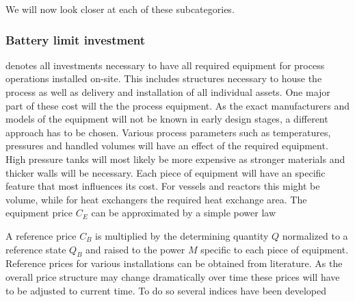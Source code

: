 %

We will now look closer at each of these subcategories. 

\subsubsection{Battery limit investment} denotes all investments necessary to have all required equipment 
for process operations installed on-site. This includes structures necessary to house the process as well as
 delivery and installation of all individual assets.  One major part of these cost will the the process 
 equipment. As the exact manufacturers and models of the equipment will not be known in early design 
 stages, a different approach has to be chosen. Various process parameters such as temperatures, 
 pressures and handled volumes will have an effect of the required equipment. High pressure tanks will 
 most likely be more expensive as stronger materials and thicker walls will be necessary. Each piece of 
 equipment will have an specific feature that most influences its cost. For vessels and reactors this might be 
 volume, while for heat exchangers the required heat exchange area. The equipment price $C_E$ can be 
 approximated by a simple power law
%

A reference price $C_B$ is multiplied by the determining quantity $Q$ normalized to a reference state 
$Q_B$ and raised to the power $M$ specific to each piece of equipment. Reference prices for various 
installations can be obtained from literature. 
As the overall price structure may change dramatically over time these prices will have to be adjusted to 
current time. To do so several indices have been developed
%

